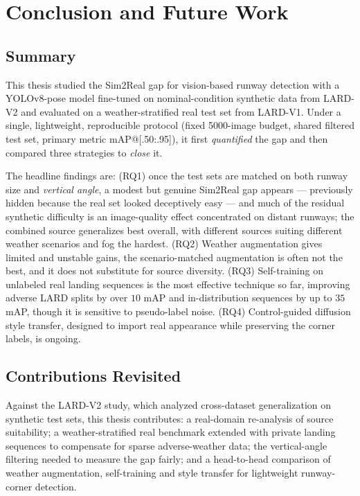 \section{Conclusion and Future Work}
\label{sec:conclusion}

\subsection{Summary}
\label{subsec:concl-summary}
This thesis studied the Sim2Real gap for vision-based runway detection with a
YOLOv8-pose model fine-tuned on nominal-condition synthetic data from LARD-V2 and
evaluated on a weather-stratified real test set from LARD-V1. Under a single,
lightweight, reproducible protocol (fixed 5000-image budget, shared filtered test set,
primary metric mAP@[.50:.95]), it first \emph{quantified} the gap and then compared
three strategies to \emph{close} it.

The headline findings are: (RQ1) once the test sets are matched on both runway size and
\emph{vertical angle}, a modest but genuine Sim2Real gap appears --- previously hidden
because the real set looked deceptively easy --- and much of the residual synthetic
difficulty is an image-quality effect concentrated on distant runways; the combined
source generalizes best overall, with different sources suiting different weather
scenarios and fog the hardest. (RQ2) Weather augmentation gives limited and unstable
gains, the scenario-matched augmentation is often not the best, and it does not
substitute for source diversity. (RQ3) Self-training on unlabeled real landing sequences
is the most effective technique so far, improving adverse LARD splits by over $10$ mAP
and in-distribution sequences by up to $35$ mAP, though it is sensitive to pseudo-label
noise. (RQ4) Control-guided diffusion style transfer, designed to import real appearance
while preserving the corner labels, is ongoing.

\subsection{Contributions Revisited}
\label{subsec:concl-contrib}
Against the LARD-V2 study, which analyzed cross-dataset generalization on synthetic test
sets, this thesis contributes: a real-domain re-analysis of source suitability; a
weather-stratified real benchmark extended with private landing sequences to compensate
for sparse adverse-weather data; the vertical-angle filtering needed to measure the gap
fairly; and a head-to-head comparison of weather augmentation, self-training and
style transfer for lightweight runway-corner detection.

